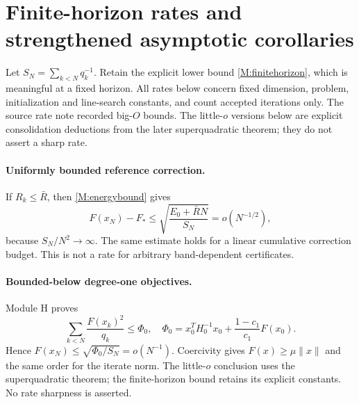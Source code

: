 \documentclass[10pt,oneside,openany]{book}
\theoremstyle{remark}\newtheorem{remark}{Remark}[chapter]
\begin{document}
\section{Finite-horizon rates and strengthened asymptotic corollaries}
Let $S_N=\sum_{k<N}q_k^{-1}$. Retain the explicit lower bound \eqref{M:finitehorizon}, which is meaningful at a fixed horizon. All rates below concern fixed dimension, problem, initialization and line-search constants, and count accepted iterations only. The source rate note recorded big-$O$ bounds. The little-$o$ versions below are explicit consolidation deductions from the later superquadratic theorem; they do not assert a sharp rate.

\paragraph{Uniformly bounded reference correction.}
If $R_k\le\bar R$, then \eqref{M:energybound} gives
\[
 F(x_N)-F_*\le\sqrt{\frac{E_0+\bar RN}{S_N}}=o(N^{-1/2}),
\]
because $S_N/N^2\to\infty$. The same estimate holds for a linear cumulative correction budget. This is not a rate for arbitrary band-dependent certificates.

\paragraph{Bounded-below degree-one objectives.}
Module H proves
\[
 \sum_{k<N}\frac{F(x_k)^2}{q_k}\le\Phi_0,
\quad \Phi_0=x_0^TH_0^{-1}x_0+\frac{1-c_1}{c_1}F(x_0).
\]
Hence $F(x_N)\le\sqrt{\Phi_0/S_N}=o(N^{-1})$. Coercivity gives $F(x)\ge\mu\|x\|$ and the same order for the iterate norm. The little-$o$ conclusion uses the superquadratic theorem; the finite-horizon bound retains its explicit constants. No rate sharpness is asserted.
\end{document}
